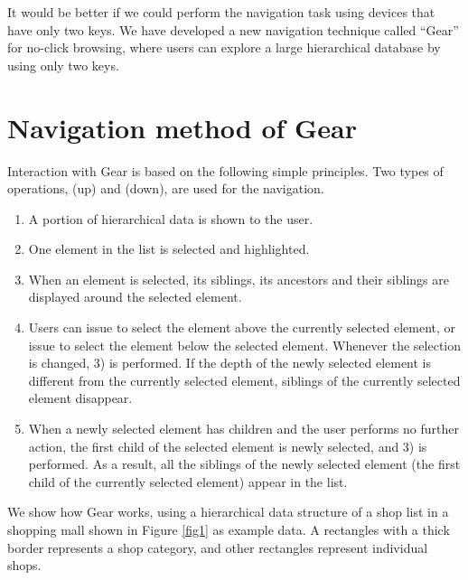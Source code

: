 \documentclass[conference]{IEEEtran}
\def\up{\tsf{▲}}
\def\down{\tsf{▼}}
\begin{document}
It would be better
if we could perform the navigation task using devices that have only two keys.
%
We have developed a new navigation technique called ``{Gear}'' for no-click browsing,
where users can explore a large hierarchical database by using only two keys.


\section{Navigation method of Gear}
\label{navigation}

Interaction with Gear is based on the following simple principles.
Two types of operations,
{\up} (up) and {\down} (down), are used for the navigation.

\begin{enumerate}
\item A portion of hierarchical data is shown to the user.

\item One element in the list is selected and highlighted.


\item When an element is selected, its siblings, its ancestors and their siblings are displayed
around the selected element.

\item Users can issue {\up} to select the element above the currently selected element,
or issue {\down} to select the element below the selected element.
Whenever the selection is changed, 3) is performed.
If the depth of the newly selected element is different from the currently
selected element, siblings of the currently selected element disappear.

\item When a newly selected element has children and the user performs no further action,
the first child of the selected element is newly selected, and 3) is performed.
As a result, all the siblings of the newly selected element
(the first child of the currently selected element) appear in the list.

\end{enumerate}

We show how Gear works, using a hierarchical data structure of
a shop list in a shopping mall shown in Figure \ref{fig1} as example data.
A rectangles with a thick border represents a shop category, and
other rectangles represent individual shops.
\end{document}
